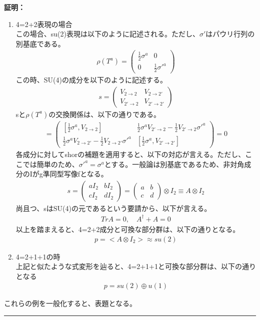 \documentclass[dvipdfmx,a4paper,10.5pt]{article}
\numberwithin{equation}{section}
\newenvironment{proofbox}
{\begin{prooflabel}\textbf{証明：}\end{prooflabel}\vspace{0.8em}}
{\par\vspace{1em}\hrule\vspace{1em}}
\begin{document}
\begin{proofbox}
\begin{enumerate}
\begin{enumerate}
        \item 4=2+2表現の場合\\
        この場合、su(2)表現は以下のように記述される。ただし、$\sigma'$はパウリ行列の別基底である。
         \begin{align*}
            \rho(T^{a})=
            \begin{pmatrix}
           \frac{1}{2}\sigma^{a} & 0 \\0 & \frac{1}{2}\sigma'^{a}
            \end{pmatrix}
        \end{align*}
        この時、SU(4)の成分を以下のように記述する。
       \begin{align*}
            s=\begin{pmatrix}
           V_{2\to 2} & V_{2\to2'} \\V_{2'\to 2} & V_{2'\to 2'}
            \end{pmatrix}
        \end{align*}
        sと$\rho(T^{a})$の交換関係は、以下の通りである。
        \begin{align*}
            [s,\rho(T^{a})]=\begin{pmatrix}
           [\frac{1}{2}\sigma^{a},V_{2\to 2}] & \frac{1}{2}\sigma^{a}V_{2'\to 2}-\frac{1}{2}V_{2'\to 2}\sigma'^{a} \\ \frac{1}{2}\sigma^{a}V_{2\to 2'}-\frac{1}{2}V_{2\to 2'}\sigma'^{a}& [\frac{1}{2}\sigma^{a},V_{2'\to 2'}]
            \end{pmatrix}=0
        \end{align*}
    各成分に対してshorの補題を適用すると、以下の対応が言える。ただし、ここでは簡単のため、$\sigma'^{a}=\sigma^{a}$とする。一般論は別基底であるため、非対角成分のIがg準同型写像fとなる。
    \begin{align*}
        s=\begin{pmatrix}
            aI_{2}&bI_{2}\\
            cI_{2}&dI_{2}
        \end{pmatrix}=\begin{pmatrix}
            a&b\\
            c&d
        \end{pmatrix}\otimes I_{2}\equiv A\otimes I_{2}
    \end{align*}
    尚且つ、sはSU(4)の元であるという要請から、以下が言える。
    \begin{align*}
        Tr A=0,\quad A^{\dagger}+A=0
    \end{align*}
    以上を踏まえると、4=2+2成分と可換な部分群は、以下の通りとなる。
    \begin{align*}
        p=<A\otimes I_{2}>\approx su(2)
    \end{align*}
    \item 4=2+1+1の時\\
    上記と似たような式変形を辿ると、4=2+1+1と可換な部分群は、以下の通りとなる
    \begin{align*}
        p=su(2)\oplus u(1)
    \end{align*}
    \end{enumerate}
これらの例を一般化すると、表題となる。
    

\end{enumerate}
\end{proofbox}
\end{document}
